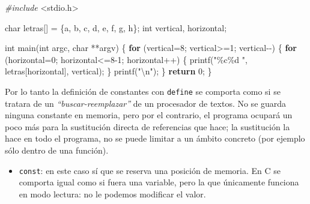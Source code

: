 \documentclass[
]{book}
\newenvironment{Shaded}{\begin{snugshade}}{\end{snugshade}}
\newcommand{\CharTok}[1]{\textcolor[rgb]{0.31,0.60,0.02}{#1}}
\newcommand{\ControlFlowTok}[1]{\textcolor[rgb]{0.13,0.29,0.53}{\textbf{#1}}}
\newcommand{\DataTypeTok}[1]{\textcolor[rgb]{0.13,0.29,0.53}{#1}}
\newcommand{\DecValTok}[1]{\textcolor[rgb]{0.00,0.00,0.81}{#1}}
\newcommand{\ImportTok}[1]{#1}
\newcommand{\NormalTok}[1]{#1}
\newcommand{\PreprocessorTok}[1]{\textcolor[rgb]{0.56,0.35,0.01}{\textit{#1}}}
\newcommand{\SpecialCharTok}[1]{\textcolor[rgb]{0.00,0.00,0.00}{#1}}
\newcommand{\StringTok}[1]{\textcolor[rgb]{0.31,0.60,0.02}{#1}}
\providecommand{\tightlist}{%
  \setlength{\itemsep}{0pt}\setlength{\parskip}{0pt}}
\begin{document}
\begin{Shaded}
\begin{Highlighting}[]
\PreprocessorTok{\#include }\ImportTok{\textless{}stdio.h\textgreater{}}

\DataTypeTok{char}\NormalTok{ letras[] = \{}\CharTok{\textquotesingle{}a\textquotesingle{}}\NormalTok{, }\CharTok{\textquotesingle{}b\textquotesingle{}}\NormalTok{, }\CharTok{\textquotesingle{}c\textquotesingle{}}\NormalTok{, }\CharTok{\textquotesingle{}d\textquotesingle{}}\NormalTok{, }\CharTok{\textquotesingle{}e\textquotesingle{}}\NormalTok{, }\CharTok{\textquotesingle{}f\textquotesingle{}}\NormalTok{, }\CharTok{\textquotesingle{}g\textquotesingle{}}\NormalTok{, }\CharTok{\textquotesingle{}h\textquotesingle{}}\NormalTok{\};}
\DataTypeTok{int}\NormalTok{ vertical, horizontal;}

\DataTypeTok{int}\NormalTok{ main(}\DataTypeTok{int}\NormalTok{ argc, }\DataTypeTok{char}\NormalTok{ **argv) \{}
    \ControlFlowTok{for}\NormalTok{ (vertical=}\DecValTok{8}\NormalTok{; vertical\textgreater{}=}\DecValTok{1}\NormalTok{; vertical{-}{-}) \{}
        \ControlFlowTok{for}\NormalTok{ (horizontal=}\DecValTok{0}\NormalTok{; horizontal\textless{}=}\DecValTok{8}\NormalTok{{-}}\DecValTok{1}\NormalTok{; horizontal++) \{}
\NormalTok{            printf(}\StringTok{"\%c\%d "}\NormalTok{, letras[horizontal], vertical);}
\NormalTok{        \}}
\NormalTok{        printf(}\StringTok{"}\SpecialCharTok{\textbackslash{}n}\StringTok{"}\NormalTok{);}
\NormalTok{    \}}
    \ControlFlowTok{return} \DecValTok{0}\NormalTok{;}
\NormalTok{\}}
\end{Highlighting}
\end{Shaded}

Por lo tanto la definición de constantes con \texttt{define} se comporta como si se tratara de un \emph{``buscar-reemplazar''} de un procesador de textos. No se guarda ninguna constante en memoria, pero por el contrario, el programa ocupará un poco más para la sustitución directa de referencias que hace; la sustitución la hace en todo el programa, no se puede limitar a un ámbito concreto (por ejemplo sólo dentro de una función).

\begin{itemize}
\tightlist
\item
  \texttt{const}: en este caso sí que se reserva una posición de memoria. En C se comporta igual como si fuera una variable, pero la que únicamente funciona en modo lectura: no le podemos modificar el valor.
\end{itemize}
\end{document}
